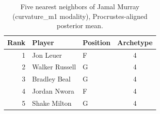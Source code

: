 \begin{table}[htbp]
  \centering\small
  \begin{tabular}{rllc}
    \toprule
    Rank & Player & Position & Archetype \\
    \midrule
    1 & Jon Leuer & F & 4 \\
    2 & Walker Russell & G & 4 \\
    3 & Bradley Beal & G & 4 \\
    4 & Jordan Nwora & F & 4 \\
    5 & Shake Milton & G & 4 \\
    \bottomrule
  \end{tabular}
  \caption{Five nearest neighbors of Jamal Murray (curvature_m1 modality), Procrustes-aligned posterior mean.}
  \label{tab:Jamal_Murray_neighbors_curvature_m1}
\end{table}

